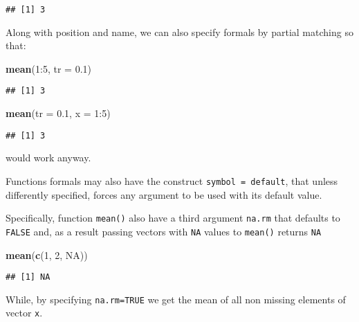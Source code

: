 \documentclass[]{book}
\newenvironment{Shaded}{\begin{snugshade}}{\end{snugshade}}
\newcommand{\KeywordTok}[1]{\textcolor[rgb]{0.13,0.29,0.53}{\textbf{{#1}}}}
\newcommand{\DataTypeTok}[1]{\textcolor[rgb]{0.13,0.29,0.53}{{#1}}}
\newcommand{\DecValTok}[1]{\textcolor[rgb]{0.00,0.00,0.81}{{#1}}}
\newcommand{\FloatTok}[1]{\textcolor[rgb]{0.00,0.00,0.81}{{#1}}}
\newcommand{\OtherTok}[1]{\textcolor[rgb]{0.56,0.35,0.01}{{#1}}}
\newcommand{\NormalTok}[1]{{#1}}
\begin{document}
\begin{verbatim}
## [1] 3
\end{verbatim}

Along with position and name, we can also specify formals by partial
matching so that:

\begin{Shaded}
\begin{Highlighting}[]
\KeywordTok{mean}\NormalTok{(}\DecValTok{1}\NormalTok{:}\DecValTok{5}\NormalTok{, }\DataTypeTok{tr =} \FloatTok{0.1}\NormalTok{)}
\end{Highlighting}
\end{Shaded}

\begin{verbatim}
## [1] 3
\end{verbatim}

\begin{Shaded}
\begin{Highlighting}[]
\KeywordTok{mean}\NormalTok{(}\DataTypeTok{tr =} \FloatTok{0.1}\NormalTok{, }\DataTypeTok{x =} \DecValTok{1}\NormalTok{:}\DecValTok{5}\NormalTok{)}
\end{Highlighting}
\end{Shaded}

\begin{verbatim}
## [1] 3
\end{verbatim}

would work anyway.

Functions formals may also have the construct
\texttt{symbol\ =\ default}, that unless differently specified, forces
any argument to be used with its default value.

Specifically, function \texttt{mean()} also have a third argument
\texttt{na.rm} that defaults to \texttt{FALSE} and, as a result passing
vectors with \texttt{NA} values to \texttt{mean()} returns \texttt{NA}

\begin{Shaded}
\begin{Highlighting}[]
\KeywordTok{mean}\NormalTok{(}\KeywordTok{c}\NormalTok{(}\DecValTok{1}\NormalTok{, }\DecValTok{2}\NormalTok{, }\OtherTok{NA}\NormalTok{))}
\end{Highlighting}
\end{Shaded}

\begin{verbatim}
## [1] NA
\end{verbatim}

While, by specifying \texttt{na.rm=TRUE} we get the mean of all non
missing elements of vector \texttt{x}.
\end{document}
